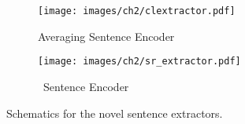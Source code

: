 \begin{figure}
\begin{subfigure}{0.5\textwidth}
  \centering
  \texttt{[image: images/ch2/clextractor.pdf]}
  \caption{Averaging Sentence Encoder}
  \label{fig:sfig1}
\end{subfigure}
\begin{subfigure}{0.5\textwidth}
  \centering
  \texttt{[image: images/ch2/sr\_extractor.pdf]}
  \caption{\RecurrentNeuralNetwork~Sentence Encoder}
  \label{fig:sfig2}
\end{subfigure}
    \caption{Schematics for the novel sentence extractors.}
\label{fig:sentenceEncoders}
\end{figure}


